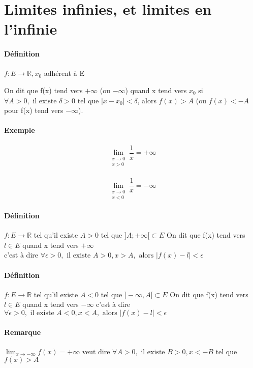 \section{Limites infinies, et limites en l'infinie}
\paragraph{Définition} $f:E\rightarrow \mathbb{R}, x_0$ adhérent à E

On dit que f(x) tend vers $+\infty$ (ou $-\infty$) quand x tend vers $x_0$ si $\forall A > 0, \text{ il existe } \delta > 0 \text{ tel que } |x - x_0| < \delta$, alors $f(x) > A$ (ou $f(x) < -A$ pour f(x) tend vers $-\infty$).

\paragraph{Exemple} \[\lim_{\substack{x \to 0 \\ x > 0}} \frac{1}{x} = +\infty\]
~\\

\[\lim_{\substack{x \to 0 \\ x < 0}} \frac{1}{x} = -\infty\]

\paragraph{Définition} $f:E \rightarrow \mathbb{R}$ tel qu'il existe $A >0$ tel que $]A; +\infty[ \subset E$
	On dit que f(x) tend vers $l \in E$ quand x tend vers $+\infty$ 
	~\\
	c'est à dire $\forall \epsilon > 0, \text{ il existe } A >0, x > A, \text{ alors } |f(x) - l| < \epsilon$

\paragraph{Définition} $f:E \rightarrow \mathbb{R}$ tel qu'il existe $A <0$ tel que $]-\infty, A[ \subset E$
	On dit que f(x) tend vers $l \in E$ quand x tend vers $-\infty$ 
	c'est à dire $\forall \epsilon > 0, \text{ il existe } A <0, x < A, \text{ alors } |f(x) - l| < \epsilon$

	\paragraph{Remarque} $\lim_{x \to -\infty} f(x) = +\infty$ veut dire 
	$\forall A >0, \text{ il existe } B > 0, x < -B$ tel que $f(x) > A$

